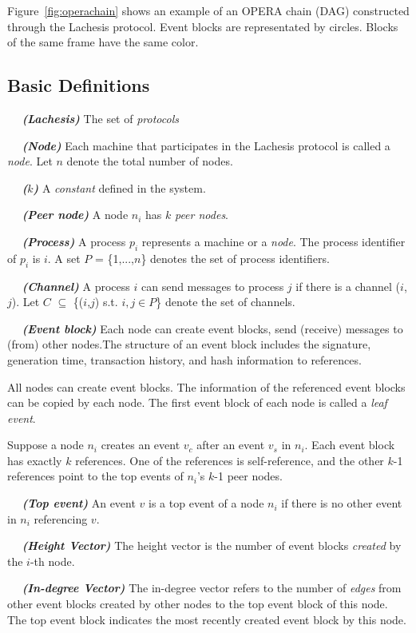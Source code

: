 \documentclass{article}
\newcommand{\dfnn}[2]{$\quad$ \textbf{\emph{(#1)}} {#2}}
\begin{document}
Figure~\ref{fig:operachain} shows an example of an OPERA chain (DAG) constructed through the Lachesis protocol. Event blocks are representated by circles. Blocks of the same frame have the same color.

\subsection{Basic Definitions}

\dfnn{Lachesis}{The set of \emph{protocols}}

\dfnn{Node}{Each machine that participates in the Lachesis protocol is called a \emph{node}. Let $n$ denote the total number of nodes.}

\dfnn{$k$}{A \emph{constant} defined in the system.}

\dfnn{Peer node}{A node $n_i$ has $k$ \emph{peer nodes}.}

\dfnn{Process}{A process $p_i$ represents a machine or a \emph{node}. The process identifier of $p_i$ is $i$. A set $P$ = \{1,...,$n$\} denotes the set of process identifiers.}

\dfnn{Channel}{A process $i$ can send messages to process $j$ if there is a channel ($i$,$j$). Let $C$ $\subseteq$ \{($i$,$j$) s.t. $i,j \in P$\} denote the set of channels.}

\dfnn{Event block}{Each node can create event blocks, send (receive) messages to (from) other nodes.The structure of an event block includes the signature, generation time, transaction history, and hash information to references.}

All nodes can create event blocks. The information of the referenced event blocks can be copied by each node. The first event block of each node is called a \emph{leaf event}.
 
Suppose a node $n_i$ creates an event $v_c$ after an event $v_s$ in $n_i$.  Each event block has exactly $k$ references. One of the references is self-reference, and the other $k$-1 references point to the top events of $n_i$'s $k$-1 peer nodes.

\dfnn{Top event}{An event $v$ is a top event of a node $n_i$ if there is no other event in $n_i$ referencing $v$.}

\dfnn{Height Vector}{The height vector is the number of event blocks \emph{created} by the $i$-th node.}

\dfnn{In-degree Vector}{The in-degree vector refers to the number of \emph{edges} from other event blocks created by other nodes to the top event block of this node. The top event block indicates the most recently created event block by this node.}
\end{document}
